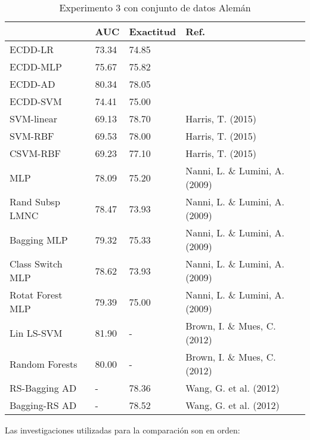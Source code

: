 \begin{table}[]
\centering
\caption{Experimento 3 con conjunto de datos Alemán}
\label{tab:german-proc3}
\begin{tabularx}{\textwidth}{|l|Y Y l|}
						\hline
						& AUC		& Exactitud	& Ref.									\\
						\hline
ECDD-LR					& 73.34		& 74.85		&										\\		%
ECDD-MLP				& 75.67		& 75.82		&										\\		%
ECDD-AD					& 80.34		& 78.05		&										\\		%
ECDD-SVM				& 74.41		& 75.00		&										\\		%
						\hline
SVM-linear				& 69.13		& 78.70		& Harris, T. (2015)						\\		%
SVM-RBF					& 69.53		& 78.00		& Harris, T. (2015)						\\		%
CSVM-RBF				& 69.23		& 77.10		& Harris, T. (2015)						\\		%
MLP						& 78.09		& 75.20		& Nanni, L. \& Lumini, A. (2009)		\\		%
Rand Subsp LMNC			& 78.47		& 73.93		& Nanni, L. \& Lumini, A. (2009)		\\		%
Bagging MLP				& 79.32		& 75.33		& Nanni, L. \& Lumini, A. (2009)		\\		%
Class Switch MLP		& 78.62		& 73.93		& Nanni, L. \& Lumini, A. (2009)		\\		%
Rotat Forest MLP		& 79.39		& 75.00		& Nanni, L. \& Lumini, A. (2009)		\\		%
Lin LS-SVM				& 81.90		& -			& Brown, I. \& Mues, C. (2012)			\\		%
Random Forests			& 80.00		& -			& Brown, I. \& Mues, C. (2012)			\\		%
RS-Bagging AD			& -			& 78.36		& Wang, G. et al. (2012)				\\		%
Bagging-RS AD			& -			& 78.52		& Wang, G. et al. (2012)				\\		%
						\hline
\end{tabularx}
\par
\small
Las investigaciones utilizadas para la comparación son en orden: \citep{harris2015credit, nanni2009experimental, brown2012experimental, wang2012two}
\end{table}

